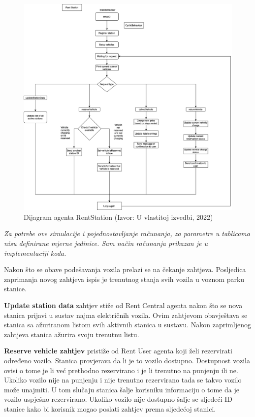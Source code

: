 \documentclass{foi}
\begin{document}
\pagebreak

\begin{figure}[h!]
	\centering
	\includegraphics[width=1.0\textwidth]{slike/rentStationSheme.png}
	\caption{Dijagram agenta RentStation (Izvor: U vlastitoj izvedbi, 2022)}
\end{figure}

 \textit{Za potrebe ove simulacije i pojednostavljanje računanja, za parametre u tablicama nisu definirane mjerne jedinice. Sam način računanja prikazan je u implementaciji koda.}

Nakon što se obave podešavanja vozila prelazi se na čekanje zahtjeva. Posljedica zaprimanja novog zahtjeva ispis je trenutnog stanja svih vozila u voznom parku stanice.

\textbf{Update station data} zahtjev stiže od Rent Central agenta nakon što se nova stanica prijavi u sustav najma električnih vozila. Ovim zahtjevom obavještava se stanica sa ažuriranom listom svih aktivnih stanica u sustavu. Nakon zaprimljenog zahtjeva stanica ažurira svoju trenutnu listu.

\textbf{Reserve vehicle zahtjev} pristiže od Rent User agenta koji želi rezervirati određeno vozilo. Stanica provjerava da li je to vozilo dostupno. Dostupnost vozila ovisi o tome je li već prethodno rezervirano i je li trenutno na punjenju ili ne. Ukoliko vozilo nije na punjenju i nije trenutno rezervirano tada se takvo vozilo može unajmiti. U tom slučaju stanica šalje korisniku informaciju o tome da je vozilo uspješno rezervirano. Ukoliko vozilo nije dostupno šalje se sljedeći ID stanice kako bi korisnik mogao poslati zahtjev prema sljedećoj stanici.
\end{document}
